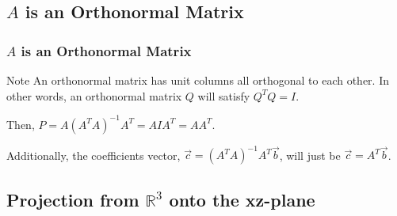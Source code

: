 \documentclass[12pt]{beamer}
\begin{document}
\subsection{$A$ is an Orthonormal Matrix}

\begin{frame}
    \frametitle{$A$ is an Orthonormal Matrix}

    \begin{block}{Note}
        An orthonormal matrix has unit columns all orthogonal to each other.
        In other words, an orthonormal matrix $Q$ will satisfy $Q^T Q = I$.
    \end{block}

    \pause

    Then, $P=A(A^T A)^{-1} A^T= A I A^T = A A^T$.

    \pause

    Additionally, the coefficients vector, $\vec{c} = (A^T A)^{-1} A^T \vec{b}$, will just be $\vec{c} = A^T \vec{b}$.
\end{frame}

\subsection{Projection from $\mathbb{R}^3$ onto the xz-plane}
\end{document}
